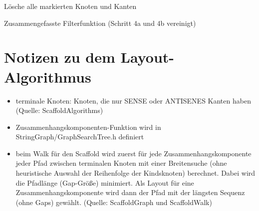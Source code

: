 \documentclass[a4paper,10pt,parskip]{scrartcl}
\begin{document}
\begin{algorithm}[H]
  Lösche alle markierten Knoten und Kanten\;
  \caption{Zusammengefasste Filterfunktion (Schritt 4a und 4b vereinigt)}
\end{algorithm}


\section{Notizen zu dem Layout-Algorithmus}

\begin{itemize}
\item terminale Knoten: Knoten, die nur SENSE oder ANTISENES Kanten
  haben (Quelle: ScaffoldAlgorithms)
\item Zusammenhangskomponenten-Funktion wird in
  StringGraph/GraphSearchTree.h definiert
\item beim Walk für den Scaffold wird zuerst für jede
  Zusammenhangskomponente jeder Pfad zwischen terminalen Knoten mit
  einer Breitensuche (ohne heuristische Auswahl der Reihenfolge der
  Kindsknoten) berechnet. Dabei wird die Pfadlänge (Gap-Größe)
  minimiert. Als Layout für eine Zusammenhangskomponente wird dann
  der Pfad mit der längsten Sequenz (ohne Gaps) gewählt. (Quelle:
  ScaffoldGraph und ScaffoldWalk)
\end{itemize}
\end{document}
